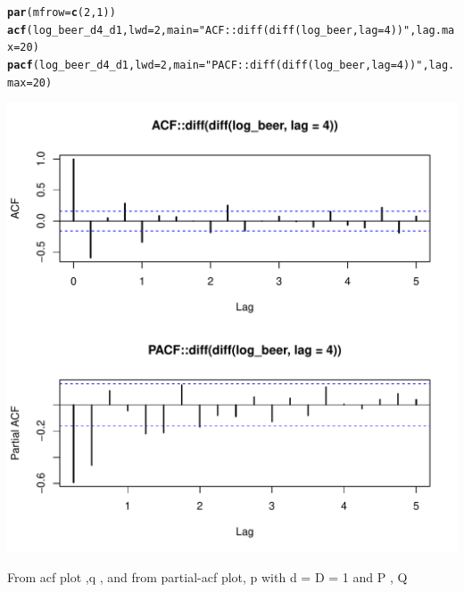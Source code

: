\documentclass[10pt]{article}\usepackage[]{graphicx}\usepackage[]{color}
\makeatletter
\def\maxwidth{ %
  \ifdim\Gin@nat@width>\linewidth
    \linewidth
  \else
    \Gin@nat@width
  \fi
}
\newcommand{\hlnum}[1]{\textcolor[rgb]{0.686,0.059,0.569}{#1}}%
\newcommand{\hlstr}[1]{\textcolor[rgb]{0.192,0.494,0.8}{#1}}%
\newcommand{\hlstd}[1]{\textcolor[rgb]{0.345,0.345,0.345}{#1}}%
\newcommand{\hlkwc}[1]{\textcolor[rgb]{0.333,0.667,0.333}{#1}}%
\newcommand{\hlkwd}[1]{\textcolor[rgb]{0.737,0.353,0.396}{\textbf{#1}}}%
\newenvironment{kframe}{%
 \def\at@end@of@kframe{}%
 \ifinner\ifhmode%
  \def\at@end@of@kframe{\end{minipage}}%
  \begin{minipage}{\columnwidth}%
 \fi\fi%
 \def\FrameCommand##1{\hskip\@totalleftmargin \hskip-\fboxsep
 \colorbox{shadecolor}{##1}\hskip-\fboxsep
     \hskip-\linewidth \hskip-\@totalleftmargin \hskip\columnwidth}%
 \MakeFramed {\advance\hsize-\width
   \@totalleftmargin\z@ \linewidth\hsize
   \@setminipage}}%
 {\par\unskip\endMakeFramed%
 \at@end@of@kframe}
\newenvironment{knitrout}{}{} %
\makeatother
\begin{document}
\begin{knitrout}
\begin{kframe}\begin{alltt}
\hlkwd{par}\hlstd{(}\hlkwc{mfrow}\hlstd{=}\hlkwd{c}\hlstd{(}\hlnum{2}\hlstd{,}\hlnum{1}\hlstd{))}
\hlkwd{acf}\hlstd{(log_beer_d4_d1,}\hlkwc{lwd} \hlstd{=} \hlnum{2}\hlstd{,} \hlkwc{main} \hlstd{=} \hlstr{"ACF::diff(diff(log_beer, lag = 4))"}\hlstd{,}\hlkwc{lag.max} \hlstd{=} \hlnum{20}\hlstd{)}
\hlkwd{pacf}\hlstd{(log_beer_d4_d1,}\hlkwc{lwd} \hlstd{=} \hlnum{2}\hlstd{,} \hlkwc{main} \hlstd{=} \hlstr{"PACF::diff(diff(log_beer, lag = 4))"}\hlstd{,}\hlkwc{lag.max} \hlstd{=} \hlnum{20}\hlstd{)}
\end{alltt}
\end{kframe}
\includegraphics[width=\maxwidth]{figure/unnamed-chunk-17-4} 

\end{knitrout}
From acf plot ,q , and from partial-acf plot, p  with d = D = 1 and P , Q 
\end{document}
